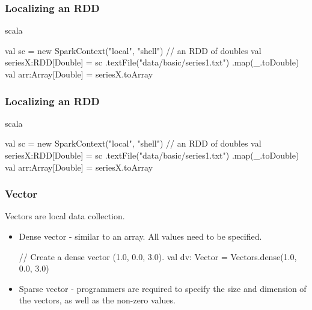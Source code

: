 \documentclass{beamer}
\newcommand{\beb}{\begin{exampleblock}}
\newcommand{\eeb}{\end{exampleblock}}
\begin{document}


\begin{frame}[fragile]
\frametitle{Localizing an RDD}

\beb{scala}
\begin{code}
val sc = new SparkContext("local", "shell")	
// an RDD of doubles 
val seriesX:RDD[Double] = sc
  .textFile("data/basic/series1.txt")
  .map(_.toDouble)
val arr:Array[Double] = seriesX.toArray
\end{code}
\eeb

\end{frame}




\begin{frame}[fragile]
\frametitle{Localizing an RDD}

\beb{scala}
\begin{code}
val sc = new SparkContext("local", "shell")	
// an RDD of doubles 
val seriesX:RDD[Double] = sc
  .textFile("data/basic/series1.txt")
  .map(_.toDouble)
val arr:Array[Double] = seriesX.toArray
\end{code}
\eeb

\end{frame}




\begin{frame}[fragile]
\frametitle{Vector}

Vectors are local data collection.
\begin{itemize}
\item Dense vector - similar to an array. All values need to be specified.
\beb
\begin{code}
// Create a dense vector (1.0, 0.0, 3.0).
val dv: Vector = Vectors.dense(1.0, 0.0, 3.0)
\end{code}
\eeb
\item Sparse vector - programmers are required to specify the size and dimension of the vectors,
  as well as the non-zero values.
  
\end{itemize}
\end{frame}
\end{document}
